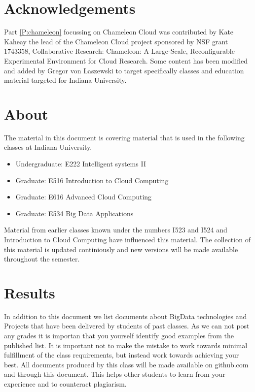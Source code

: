 \section{Acknowledgements}

Part \ref{P:chameleon} focussing on Chameleon Cloud was contributed by
Kate Kaheay the lead of the Chameleon Cloud project sponsored by NSF
grant 1743358, Collaborative Research: Chameleon: A Large-Scale,
Reconfigurable Experimental Environment for Cloud Research. Some
content has been modified and added by Gregor von Laszewski to target
specifically classes and education material targeted for Indiana
University.

\section{About}

The material in this document is covering material that is used in the
following classes at Indiana University.

\begin{itemize}
\item Undergraduate: E222 Intelligent systems II
\item Graduate: E516 Introduction to Cloud Computing
\item Graduate: E616 Advanced Cloud Computing
\item Graduate: E534 Big Data Applications
\end{itemize}

Material from earlier classes known under the numbers I523 and I524
and Introduction to Cloud Computing have influenced this material. The
collection of this material is updated continiously and new versions
will be made available throughout the semester.

\section{Results}\label{S:results}

In addition to this document we list documents about BigData
technologies and Projects that have been delivered by students of past
classes. As we can not post any grades it is importan that you
yourself identify good examples from the published list. It is
important not to make the mistake to work towards minimal fulfillment
of the class requirements, but instead work towards achieving your
best. All documents produced by this class will be made available on
github.com and through this document. This helps other students to
learn from your experience and to counteract plagiarism.

